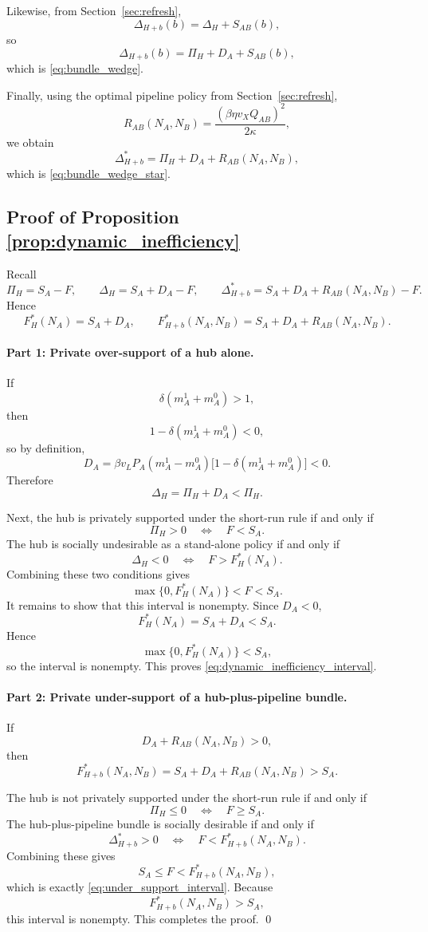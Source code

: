 Likewise, from Section~\ref{sec:refresh},
\[
\Delta_{H+b}(b)=\Delta_H+S_{AB}(b),
\]
so
\[
\Delta_{H+b}(b)=\Pi_H+D_A+S_{AB}(b),
\]
which is \eqref{eq:bundle_wedge}.

Finally, using the optimal pipeline policy from Section~\ref{sec:refresh},
\[
R_{AB}(N_A,N_B)
=
\frac{(\beta\eta v_XQ_{AB})^2}{2\kappa},
\]
we obtain
\[
\Delta_{H+b}^*=\Pi_H+D_A+R_{AB}(N_A,N_B),
\]
which is \eqref{eq:bundle_wedge_star}.

\subsection{Proof of Proposition \ref{prop:dynamic_inefficiency}}

Recall
\[
\Pi_H=S_A-F,
\qquad
\Delta_H=S_A+D_A-F,
\qquad
\Delta_{H+b}^*=S_A+D_A+R_{AB}(N_A,N_B)-F.
\]
Hence
\[
F_H^*(N_A)=S_A+D_A,
\qquad
F_{H+b}^*(N_A,N_B)=S_A+D_A+R_{AB}(N_A,N_B).
\]

\paragraph{Part 1: Private over-support of a hub alone.}
If
\[
\delta(m_A^1+m_A^0)>1,
\]
then
\[
1-\delta(m_A^1+m_A^0)<0,
\]
so by definition,
\[
D_A=\beta v_LP_A(m_A^1-m_A^0)\bigl[1-\delta(m_A^1+m_A^0)\bigr]<0.
\]
Therefore
\[
\Delta_H=\Pi_H+D_A<\Pi_H.
\]

Next, the hub is privately supported under the short-run rule if and only if
\[
\Pi_H>0
\quad\Longleftrightarrow\quad
F<S_A.
\]
The hub is socially undesirable as a stand-alone policy if and only if
\[
\Delta_H<0
\quad\Longleftrightarrow\quad
F>F_H^*(N_A).
\]
Combining these two conditions gives
\[
\max\{0,F_H^*(N_A)\}<F<S_A.
\]
It remains to show that this interval is nonempty. Since $D_A<0$,
\[
F_H^*(N_A)=S_A+D_A<S_A.
\]
Hence
\[
\max\{0,F_H^*(N_A)\}<S_A,
\]
so the interval is nonempty. This proves \eqref{eq:dynamic_inefficiency_interval}.

\paragraph{Part 2: Private under-support of a hub-plus-pipeline bundle.}
If
\[
D_A+R_{AB}(N_A,N_B)>0,
\]
then
\[
F_{H+b}^*(N_A,N_B)=S_A+D_A+R_{AB}(N_A,N_B)>S_A.
\]

The hub is not privately supported under the short-run rule if and only if
\[
\Pi_H\le 0
\quad\Longleftrightarrow\quad
F\ge S_A.
\]
The hub-plus-pipeline bundle is socially desirable if and only if
\[
\Delta_{H+b}^*>0
\quad\Longleftrightarrow\quad
F<F_{H+b}^*(N_A,N_B).
\]
Combining these gives
\[
S_A\le F<F_{H+b}^*(N_A,N_B),
\]
which is exactly \eqref{eq:under_support_interval}. Because
\[
F_{H+b}^*(N_A,N_B)>S_A,
\]
this interval is nonempty. This completes the proof.
\qed
